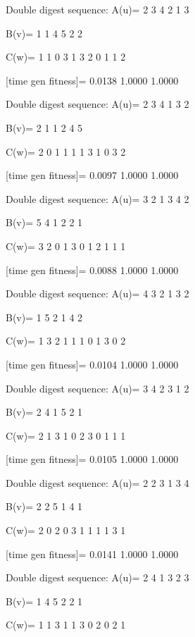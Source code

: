 Double digest sequence:
A(u)=
     2     3     4     2     1     3

B(v)=
     1     1     4     5     2     2

C(w)=
     1     1     0     3     1     3     2     0     1     1     2

[time gen fitness]=
    0.0138    1.0000    1.0000

Double digest sequence:
A(u)=
     2     3     4     1     3     2

B(v)=
     2     1     1     2     4     5

C(w)=
     2     0     1     1     1     1     3     1     0     3     2

[time gen fitness]=
    0.0097    1.0000    1.0000

Double digest sequence:
A(u)=
     3     2     1     3     4     2

B(v)=
     5     4     1     2     2     1

C(w)=
     3     2     0     1     3     0     1     2     1     1     1

[time gen fitness]=
    0.0088    1.0000    1.0000

Double digest sequence:
A(u)=
     4     3     2     1     3     2

B(v)=
     1     5     2     1     4     2

C(w)=
     1     3     2     1     1     1     0     1     3     0     2

[time gen fitness]=
    0.0104    1.0000    1.0000

Double digest sequence:
A(u)=
     3     4     2     3     1     2

B(v)=
     2     4     1     5     2     1

C(w)=
     2     1     3     1     0     2     3     0     1     1     1

[time gen fitness]=
    0.0105    1.0000    1.0000

Double digest sequence:
A(u)=
     2     2     3     1     3     4

B(v)=
     2     2     5     1     4     1

C(w)=
     2     0     2     0     3     1     1     1     1     3     1

[time gen fitness]=
    0.0141    1.0000    1.0000

Double digest sequence:
A(u)=
     2     4     1     3     2     3

B(v)=
     1     4     5     2     2     1

C(w)=
     1     1     3     1     1     3     0     2     0     2     1

